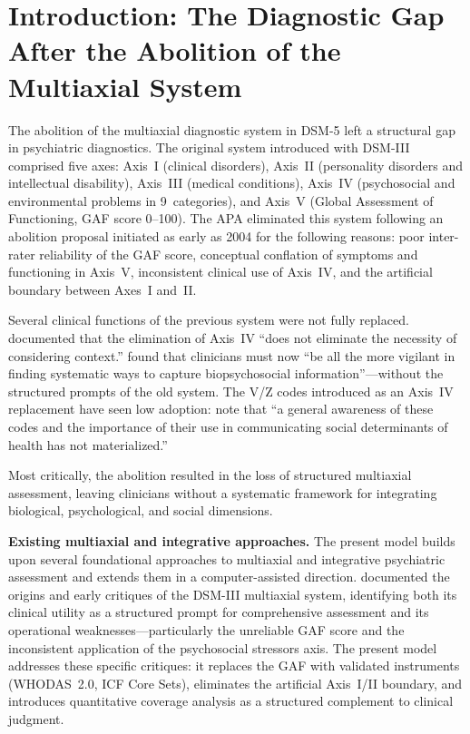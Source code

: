 \documentclass[11pt,a4paper]{article}
\begin{document}
\newpage


\section{Introduction: The Diagnostic Gap After the Abolition of the Multiaxial System}
\label{sec:introduction}

The abolition of the multiaxial diagnostic system in DSM-5 \citep{APA2013} left a structural gap in psychiatric diagnostics. The original system introduced with DSM-III \citep{APA1980DSM3} comprised five axes: Axis~I (clinical disorders), Axis~II (personality disorders and intellectual disability), Axis~III (medical conditions), Axis~IV (psychosocial and environmental problems in 9~categories), and Axis~V (Global Assessment of Functioning, GAF score 0--100). The APA eliminated this system following an abolition proposal initiated as early as 2004 for the following reasons: poor inter-rater reliability of the GAF score, conceptual conflation of symptoms and functioning in Axis~V, inconsistent clinical use of Axis~IV, and the artificial boundary between Axes~I and~II.

Several clinical functions of the previous system were not fully replaced. \citet{Probst2014} documented that the elimination of Axis~IV ``does not eliminate the necessity of considering context.'' \citet{Kress2014} found that clinicians must now ``be all the more vigilant in finding systematic ways to capture biopsychosocial information''---without the structured prompts of the old system. The V/Z codes introduced as an Axis~IV replacement have seen low adoption: \citet{ErlichFirst2025} note that ``a general awareness of these codes and the importance of their use in communicating social determinants of health has not materialized.''

Most critically, the abolition resulted in the loss of structured multiaxial assessment, leaving clinicians without a systematic framework for integrating biological, psychological, and social dimensions.

\textbf{Existing multiaxial and integrative approaches.} The present model builds upon several foundational approaches to multiaxial and integrative psychiatric assessment and extends them in a computer-assisted direction. \citet{Williams1985} documented the origins and early critiques of the DSM-III multiaxial system, identifying both its clinical utility as a structured prompt for comprehensive assessment and its operational weaknesses---particularly the unreliable GAF score and the inconsistent application of the psychosocial stressors axis. The present model addresses these specific critiques: it replaces the GAF with validated instruments (WHODAS~2.0, ICF Core Sets), eliminates the artificial Axis~I/II boundary, and introduces quantitative coverage analysis as a structured complement to clinical judgment.
\end{document}
